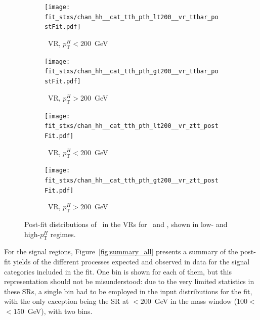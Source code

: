 \begin{figure}[htbp]
  \centering

  \begin{subfigure}[b]{0.48\textwidth}
    \centering
    \texttt{[image: fit\_stxs/chan\_hh\_\_cat\_tth\_pth\_lt200\_\_vr\_ttbar\_postFit.pdf]}
    \caption{\small \ttbar\ VR, $p_{\text{T}}^{H}<200$~GeV}
    \label{fig:postfit_vr_ttbar_lt200}
  \end{subfigure}\hfill
  \begin{subfigure}[b]{0.48\textwidth}
    \centering
    \texttt{[image: fit\_stxs/chan\_hh\_\_cat\_tth\_pth\_gt200\_\_vr\_ttbar\_postFit.pdf]}
    \caption{\small \ttbar\ VR, $p_{\text{T}}^{H}>200$~GeV}
    \label{fig:postfit_vr_ttbar_gt200}
  \end{subfigure}

  \vspace{0.45cm}

  \begin{subfigure}[b]{0.48\textwidth}
    \centering
    \texttt{[image: fit\_stxs/chan\_hh\_\_cat\_tth\_pth\_lt200\_\_vr\_ztt\_postFit.pdf]}
    \caption{\small \ztautau\ VR, $p_{\text{T}}^{H}<200$~GeV}
    \label{fig:postfit_vr_ztt_lt200}
  \end{subfigure}\hfill
  \begin{subfigure}[b]{0.48\textwidth}
    \centering
    \texttt{[image: fit\_stxs/chan\_hh\_\_cat\_tth\_pth\_gt200\_\_vr\_ztt\_postFit.pdf]}
    \caption{\small \ztautau\ VR, $p_{\text{T}}^{H}>200$~GeV}
    \label{fig:postfit_vr_ztt_gt200}
  \end{subfigure}

  \caption{Post-fit distributions of \mmc\ in the VRs for \ttbar\ and \ztautau, shown in low- and high-$p_{\text{T}}^{H}$ regimes.}
  \label{fig:postfit_vr_all}
\end{figure}

For the signal regions, Figure~\ref{fig:summary_all} presents a summary of the post-fit yields of the different processes expected and observed in data for the \ttHtt signal categories included in the fit. One bin is shown for each of them, but this representation should not be misunderstood: due to the very limited statistics in these SRs, a single bin had to be employed in the input distributions for the fit, with the only exception being the SR at \pth$<200$~GeV in the mass window ($100<$\mmc$<150$~GeV), with two bins.

